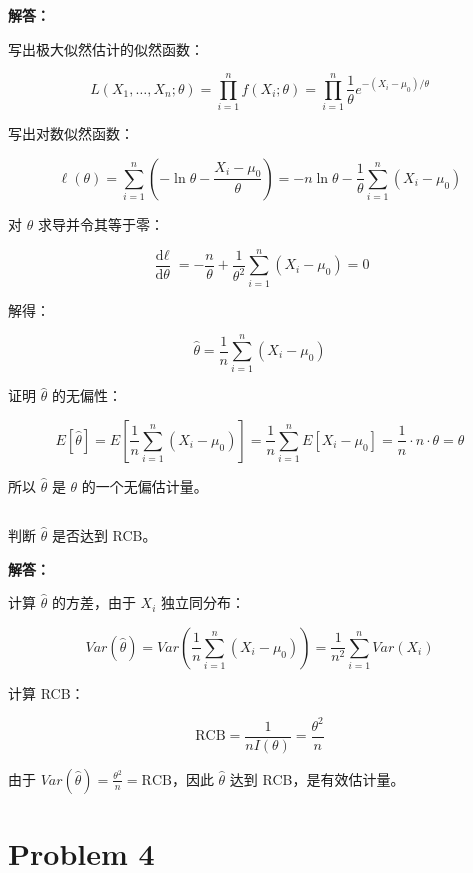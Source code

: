 \documentclass[12pt,a4paper]{article}
\begin{document}
\begin{answerbox}
\textbf{解答：}

写出极大似然估计的似然函数：

$$
L(X_1, \ldots, X_n; \theta) = \prod_{i=1}^n f(X_i; \theta) = \prod_{i=1}^n \frac{1}{\theta} e^{-(X_i-\mu_0)/\theta}
$$

写出对数似然函数：

$$
\ell(\theta) = \sum_{i=1}^n \left( -\ln \theta - \frac{X_i-\mu_0}{\theta} \right) = -n \ln \theta - \frac{1}{\theta} \sum_{i=1}^n (X_i - \mu_0)
$$

对 $\theta$ 求导并令其等于零：

$$
\frac{\text{d} \ell}{\text{d} \theta} = -\frac{n}{\theta} + \frac{1}{\theta^2} \sum_{i=1}^n (X_i - \mu_0) = 0
$$

解得：

$$
\hat{\theta} = \frac{1}{n} \sum_{i=1}^n (X_i - \mu_0)
$$

证明 $\hat{\theta}$ 的无偏性：

$$
E[\hat{\theta}] = E\left[\frac{1}{n} \sum_{i=1}^n (X_i - \mu_0)\right] = \frac{1}{n} \sum_{i=1}^n E[X_i - \mu_0] = \frac{1}{n} \cdot n \cdot \theta = \theta
$$

所以 $\hat{\theta}$ 是 $\theta$ 的一个无偏估计量。
\end{answerbox}

\subsection{}

判断 $\hat{\theta}$ 是否达到 RCB。

\begin{answerbox}
\textbf{解答：}

计算 $\hat{\theta}$ 的方差，由于 $X_i$ 独立同分布：

$$
Var(\hat{\theta}) = Var\left(\frac{1}{n} \sum_{i=1}^n (X_i - \mu_0)\right) = \frac{1}{n^2} \sum_{i=1}^n Var(X_i) 
$$

计算 RCB：

$$
\text{RCB} = \frac{1}{nI(\theta)} = \frac{\theta^2}{n}
$$

由于 $Var(\hat{\theta}) = \frac{\theta ^2}{n} = \text{RCB}$，因此 $\hat{\theta}$ 达到 RCB，是有效估计量。

\end{answerbox}

\section{Problem 4}
\end{document}
